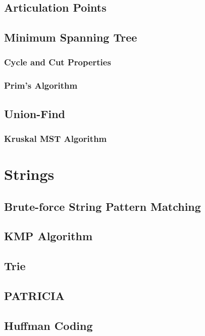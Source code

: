 \documentclass{report}
\begin{document}
\section{Articulation Points}

\section{Minimum Spanning Tree}

\subsection{Cycle and Cut Properties}

\subsection{Prim's Algorithm}

\section{Union-Find}

\subsection{Kruskal MST Algorithm}


\chapter{Strings}

\section{Brute-force String Pattern Matching}

\section{KMP Algorithm}

\section{Trie}

\section{PATRICIA}

\section{Huffman Coding}
\end{document}
